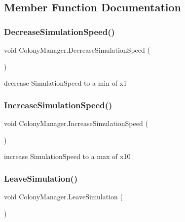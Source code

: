 \subsection{Member Function Documentation}
\mbox{\label{class_colony_manager_a855eba1e89594c5b6c7d24bf70fa6c23}} 
\subsubsection{\texorpdfstring{DecreaseSimulationSpeed()}{DecreaseSimulationSpeed()}}
{\footnotesize\ttfamily void Colony\+Manager.\+Decrease\+Simulation\+Speed (\begin{DoxyParamCaption}{ }\end{DoxyParamCaption})}



decrease Simulation\+Speed to a min of x1 

\mbox{\label{class_colony_manager_ad907cd27800161d113a4a9bbe2dd802c}} 
\subsubsection{\texorpdfstring{IncreaseSimulationSpeed()}{IncreaseSimulationSpeed()}}
{\footnotesize\ttfamily void Colony\+Manager.\+Increase\+Simulation\+Speed (\begin{DoxyParamCaption}{ }\end{DoxyParamCaption})}



increase Simulation\+Speed to a max of x10 

\mbox{\label{class_colony_manager_a48d7c987e2198265291eead3e8b50a9f}} 
\subsubsection{\texorpdfstring{LeaveSimulation()}{LeaveSimulation()}}
{\footnotesize\ttfamily void Colony\+Manager.\+Leave\+Simulation (\begin{DoxyParamCaption}{ }\end{DoxyParamCaption})}



